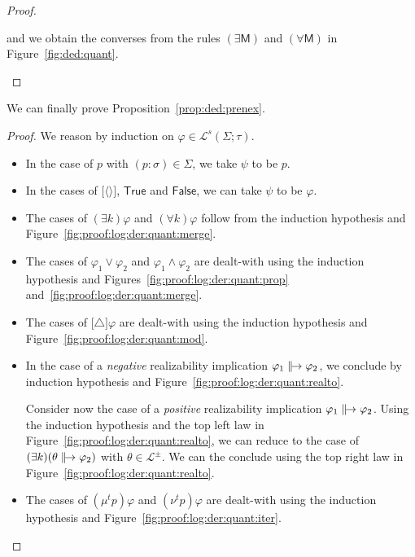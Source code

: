 \documentclass[%
  a4paper,
  UKenglish,
  cleveref,
  autoref,
  thm-restate,
  numberwithinsect,
]{lipics-v2021}
\newcommand\pair[1]{{\langle #1\rangle}}
\newcommand\ax[1]{(\mathsf{#1})}
\newcommand\temp[1]{\mathsf{#1}}
\newcommand\True{\temp{True}}
\newcommand\False{\temp{False}}
\newcommand\defrealto{\mathrel\parallel\joinrel\to}
\newcommand\realto{\mathrel{\defrealto}}
\newcommand\PT{\tau}		%
\newcommand\PTbis{\sigma}	%
\newcommand\itvar{k}
\newcommand\FP{p}
\newcommand\FPEnv{\Sigma}
\newcommand\finmu{\mu}
\newcommand\finnu{\nu}
\newcommand\Lang{\mathcal{L}}
\newcommand\form[1]{\lbrack #1 \rbrack}
\newcommand\modgen{\mathord{\triangle}}	%
\newcommand\sign{s}
\begin{document}
\begin{proof}
\begin{description}
\noindent
and we obtain the converses from the rules
$\ax{\exists M}$ and $\ax{\forall M}$
in Figure~\ref{fig:ded:quant}.
\qedhere
\end{description}
\end{proof}

We can finally prove Proposition~\ref{prop:ded:prenex}.

\PropFormPrenex*

\begin{proof}
We reason by induction on $\varphi \in \Lang^\sign(\FPEnv; \PT)$.
\begin{itemize}
\item
In the case of $\FP$ with $(\FP \colon \PTbis) \in \FPEnv$,
we take $\psi$ to be $\FP$.

\item
In the cases of $\form{\pair{}}$, $\True$ and $\False$,
we can take $\psi$ to be $\varphi$.

\item
The cases of $(\exists \itvar)\varphi$ and $(\forall \itvar)\varphi$ 
follow from the induction hypothesis
and Figure~\ref{fig:proof:log:der:quant:merge}.

\item
The cases of $\varphi_1 \lor \varphi_2$ and $\varphi_1 \land \varphi_2$
are dealt-with using the induction hypothesis and
Figures~\ref{fig:proof:log:der:quant:prop}
and~\ref{fig:proof:log:der:quant:merge}.

\item
The cases of $\form{\modgen}\varphi$ are dealt-with 
using the induction hypothesis and
Figure~\ref{fig:proof:log:der:quant:mod}.

\item
In the case of a \emph{negative} realizability implication
$\varphi_1 \realto \varphi_2$,
we conclude by induction hypothesis
and Figure~\ref{fig:proof:log:der:quant:realto}.

Consider now the case of a \emph{positive} realizability implication
$\varphi_1 \realto \varphi_2$.
Using the induction hypothesis
and the top left law in Figure~\ref{fig:proof:log:der:quant:realto},
we can reduce
to the case of
$(\exists \itvar)(\theta \realto \varphi_2)$
with $\theta \in \Lang^\pm$.
We can the conclude using the top right law
in Figure~\ref{fig:proof:log:der:quant:realto}.

\item
The cases of $(\finmu^t \FP)\varphi$ and $(\finnu^t \FP)\varphi$
are dealt-with using the induction hypothesis and
Figure~\ref{fig:proof:log:der:quant:iter}.
\qedhere
\end{itemize}
\end{proof}
\end{document}
